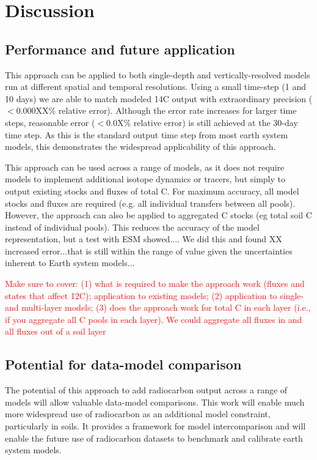 \documentclass[11pt,a4paper]{article}
\newcommand{\red}[1]{\textcolor{red}{#1}}
\begin{document}
\section{Discussion}

\subsection{Performance and future application }
This approach can be applied to both single-depth and vertically-resolved models run at different spatial and temporal resolutions. Using a small time-step (1 and 10 days) we are able to match modeled 14C output with extraordinary precision ($<$0.000XX\% relative error). Although the error rate increases for larger time steps, reasonable error ($<$0.0X\% relative error) is still achieved at the 30-day time step. As this is the standard output time step from most earth system models, this demonstrates the widespread applicability of this approach. 

This approach can be used across a range of models, as it does not require models to implement additional isotope dynamics or tracers, but simply to output existing stocks and fluxes of total C. For maximum accuracy, all model stocks and fluxes are required (e.g. all individual transfers between all pools). However, the approach can also be applied to aggregated C stocks (eg total soil C instead of individual pools). This reduces the accuracy of the model representation, but a test with ESM showed.... We did this and found XX increased error...that is still within the range of value given the uncertainties inherent to Earth system models...

\red{Make sure to cover: (1) what is required to make the approach work (fluxes and states that affect 12C); application to existing models; (2) application to single- and multi-layer models; (3) does the approach work for total C in each layer (i.e., if you aggregate all C pools in each layer). We could aggregate all fluxes in and all fluxes out of a soil layer}

\subsection{Potential for data-model comparison}

The potential of this approach to add radiocarbon output across a range of models will allow valuable data-model comparisons. This work will enable much more widespread use of radiocarbon as an additional model constraint, particularly in soils. It provides a framework for model intercomparison and will enable the future use of radiocarbon datasets to benchmark and calibrate earth system models.
\end{document}
